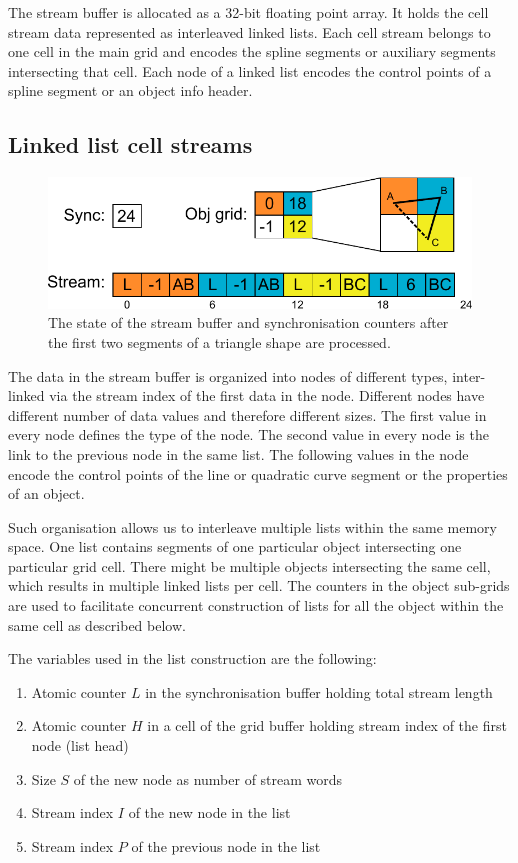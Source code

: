 \documentclass[11pt,a4paper,twoside]{article}
\begin{document}
The stream buffer is allocated as a 32-bit floating point array. It holds the cell stream data represented as interleaved linked lists. Each cell stream belongs to one cell in the main grid and encodes the spline segments or auxiliary segments intersecting that cell. Each node of a linked list encodes the control points of a spline segment or an object info header.

\subsection {Linked list cell streams}

\begin {figure}
	\centering
	\includegraphics[width=0.6\columnwidth] {figures/cell_stream}
	\caption {The state of the stream buffer and synchronisation counters after the first two segments of a triangle shape are processed.}
	\label {fig:cell_stream}
\end {figure}

The data in the stream buffer is organized into nodes of different types, inter-linked via the stream index of the first data in the node. Different nodes have different number of data values and therefore different sizes. The first value in every node defines the type of the node. The second value in every node is the link to the previous node in the same list. The following values in the node encode the control points of the line or quadratic curve segment or the properties of an object.

Such organisation allows us to interleave multiple lists within the same memory space. One list contains segments of one particular object intersecting one particular grid cell. There might be multiple objects intersecting the same cell, which results in multiple linked lists per cell. The counters in the object sub-grids are used to facilitate concurrent construction of lists for all the object within the same cell as described below.

The variables used in the list construction are the following:

\begin {enumerate}
\item
Atomic counter $L$ in the synchronisation buffer holding total stream length
\item
Atomic counter $H$ in a cell of the grid buffer holding stream index of the first node (list head)
\item
Size $S$ of the new node as number of stream words
\item
Stream index $I$ of the new node in the list
\item
Stream index $P$ of the previous node in the list
\end {enumerate}
\end{document}
